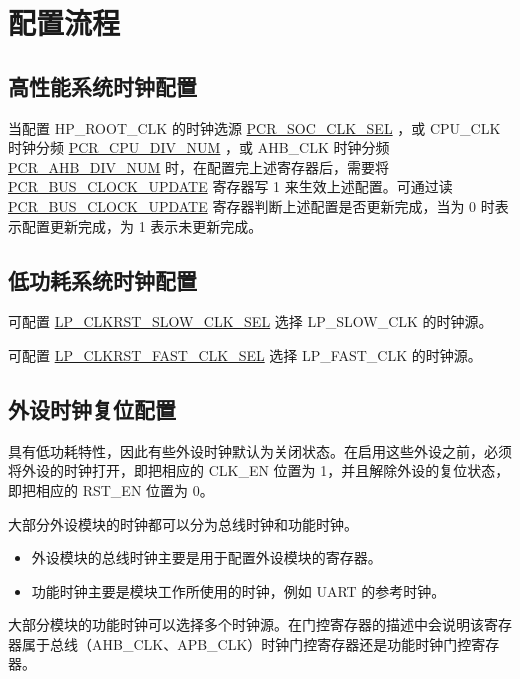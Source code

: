 \documentclass[main\_\_CN.tex]{subfiles}
\begin{document}
\section{配置流程}
\label{sec:resclk-prog-procedures}

\subsection{高性能系统时钟配置}

当配置 HP\_ROOT\_CLK 的时钟选源 \hyperref[fielddesc:PCRSOCCLKSEL]{PCR\_SOC\_CLK\_SEL} ，或 CPU\_CLK 时钟分频 \hyperref[fielddesc:PCRCPUDIVNUM]{PCR\_CPU\_DIV\_NUM} ，或 AHB\_CLK 时钟分频 \hyperref[fielddesc:PCRAHBDIVNUM]{PCR\_AHB\_DIV\_NUM} 时，在配置完上述寄存器后，需要将 \hyperref[fielddesc:PCRBUSCLOCKUPDATE]{PCR\_BUS\_CLOCK\_UPDATE} 寄存器写 1 来生效上述配置。可通过读 \hyperref[fielddesc:PCRBUSCLOCKUPDATE]{PCR\_BUS\_CLOCK\_UPDATE} 寄存器判断上述配置是否更新完成，当为 0 时表示配置更新完成，为 1 表示未更新完成。

\subsection{低功耗系统时钟配置}

可配置 \hyperref[fielddesc:LPCLKRSTSLOWCLKSEL]{LP\_CLKRST\_SLOW\_CLK\_SEL} 选择 LP\_SLOW\_CLK 的时钟源。

可配置 \hyperref[fielddesc:LPCLKRSTFASTCLKSEL]{LP\_CLKRST\_FAST\_CLK\_SEL} 选择 LP\_FAST\_CLK 的时钟源。

\subsection{外设时钟复位配置}\label{sec:resclk-periperal-clock-configuration}

\begin{importantlisting}
\vspace{-0.5em}

\chipname{} 具有低功耗特性，因此有些外设时钟默认为关闭状态。在启用这些外设之前，必须将外设的时钟打开，即把相应的 CLK\_EN 位置为 1，并且解除外设的复位状态，即把相应的 RST\_EN 位置为 0。
\end{importantlisting}

大部分外设模块的时钟都可以分为总线时钟和功能时钟。
\begin{itemize}
    \item 外设模块的总线时钟主要是用于配置外设模块的寄存器。
    \item 功能时钟主要是模块工作所使用的时钟，例如 UART 的参考时钟。
\end{itemize}
大部分模块的功能时钟可以选择多个时钟源。在门控寄存器的描述中会说明该寄存器属于总线（AHB\_CLK、APB\_CLK）时钟门控寄存器还是功能时钟门控寄存器。
\end{document}
